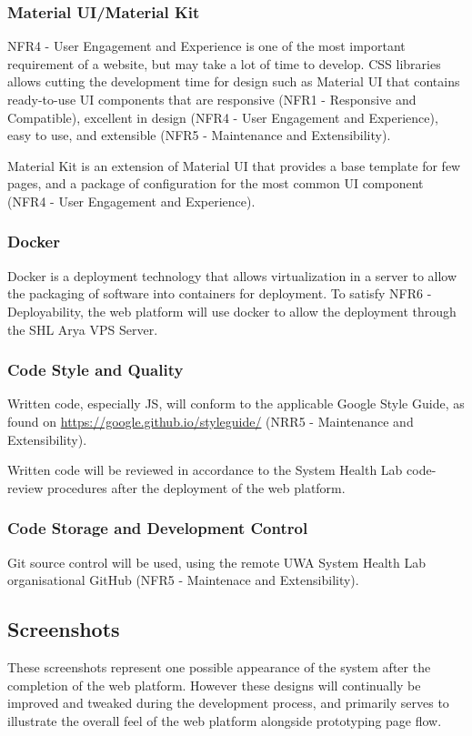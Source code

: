 \subsubsection{Material UI/Material Kit}
NFR4 - User Engagement and Experience is one of the most important requirement of a website, but may take a lot of time to develop. CSS libraries allows cutting the development time for design such as Material UI that contains ready-to-use UI components that are responsive (NFR1 - Responsive and Compatible),  excellent in design (NFR4 - User Engagement and Experience), easy to use, and extensible (NFR5 - Maintenance and Extensibility).

Material Kit is an extension of Material UI that provides a base template for few pages, and a package of configuration for the most common UI component (NFR4 - User Engagement and Experience).

\subsubsection{Docker}
Docker is a deployment technology that allows virtualization in a server to allow the packaging of software into containers for deployment. To satisfy NFR6 - Deployability, the web platform will use docker to allow the deployment through the SHL Arya VPS Server.

\subsubsection{Code Style and Quality}
Written code, especially JS, will conform to the applicable Google Style Guide, as found on \url{https://google.github.io/styleguide/} (NRR5 - Maintenance and Extensibility).

Written code will be reviewed in accordance to the System Health Lab code-review procedures after the deployment of the web platform.

\subsubsection{Code Storage and Development Control}
Git source control will be used, using the remote UWA System Health Lab organisational GitHub (NFR5 - Maintenace and Extensibility).

\subsection{Screenshots} \label{subsec:UISection}
These screenshots represent one possible appearance of the system after the completion of the web platform. However these designs will continually be improved and tweaked during the development process, and primarily serves to illustrate the overall feel of the web platform alongside prototyping page flow.

